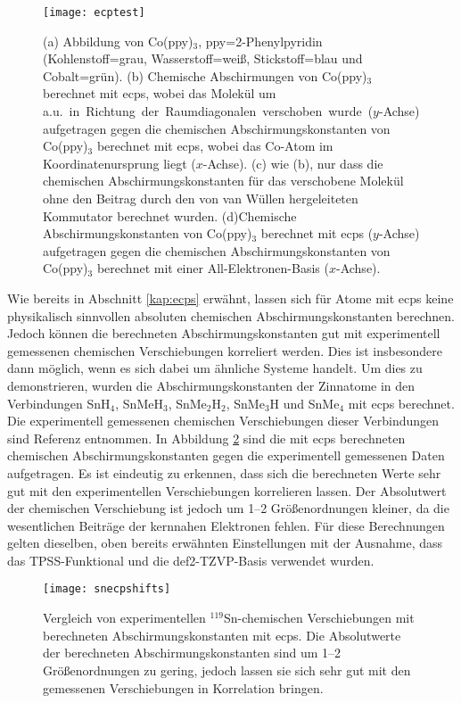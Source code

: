 \vfill
\newpage
\begin{figure}[ht!]
	\centering
	\texttt{[image: ecptest]}
	\captionsetup{figurewithin = chapter}
	\captionsetup{font=small, labelfont=bf}\caption[ECP-Testrechnungen an Co(ppy)$_3$]{\textsf{(a)} Abbildung von Co(ppy)$_3$, ppy=2-Phenylpyridin (Kohlenstoff=grau, Wasserstoff=weiß, Stickstoff=blau und Cobalt=grün). \textsf{(b)} Chemische Abschirmungen von Co(ppy)$_3$  berechnet mit \acp{ecp}, wobei das Molekül um \unit[10]{a.u.} in Richtung der Raumdiagonalen verschoben wurde ($y$-Achse) aufgetragen gegen die chemischen Abschirmungskonstanten von Co(ppy)$_3$ berechnet mit \acp{ecp}, wobei das Co-Atom im Koordinatenursprung liegt ($x$-Achse). \textsf{(c)} wie \textsf{(b)}, nur dass die chemischen Abschirmungskonstanten für das verschobene Molekül ohne den Beitrag durch den von van Wüllen hergeleiteten Kommutator berechnet wurden. \textsf{(d)}Chemische Abschirmungskonstanten von Co(ppy)$_3$ berechnet mit \acp{ecp} ($y$-Achse) aufgetragen gegen die chemischen Abschirmungskonstanten von Co(ppy)$_3$ berechnet mit einer All-Elektronen-Basis ($x$-Achse).}
\label{abb:coppy3test}
\end{figure}
\vfill
\newpage

Wie bereits in Abschnitt \ref{kap:ecps} erwähnt, lassen sich für Atome mit \acp{ecp} keine physikalisch sinnvollen absoluten chemischen Abschirmungskonstanten berechnen. Jedoch können die berechneten Abschirmungskonstanten gut mit experimentell gemessenen chemischen Verschiebungen korreliert werden. Dies ist insbesondere dann möglich, wenn es sich dabei um ähnliche Systeme handelt. Um dies zu demonstrieren, wurden die Abschirmungskonstanten der Zinnatome in den Verbindungen SnH$_4$, SnMeH$_3$, SnMe$_2$H$_2$, SnMe$_3$H und SnMe$_4$ mit \acp{ecp} berechnet. Die experimentell gemessenen chemischen Verschiebungen dieser Verbindungen sind Referenz \cite{vivas2002dft} entnommen. In Abbildung \ref{abb:snecpshifts} sind die mit \acp{ecp} berechneten chemischen Abschirmungskonstanten gegen die experimentell gemessenen Daten aufgetragen. Es ist eindeutig zu erkennen, dass sich die berechneten Werte sehr gut mit den experimentellen Verschiebungen korrelieren lassen. Der Absolutwert der chemischen Verschiebung ist jedoch um 1--2 Größenordnungen kleiner, da die wesentlichen Beiträge der kernnahen Elektronen fehlen. Für diese Berechnungen gelten dieselben, oben bereits erwähnten Einstellungen mit der Ausnahme, dass das TPSS-Funktional\supercite{tao2003climbing} und die def2-TZVP-Basis\supercite{weigend2005balanced} verwendet wurden.
\begin{figure}[ht!]
	\centering
	\texttt{[image: snecpshifts]}
	\captionsetup{figurewithin = chapter}
	\captionsetup{font=small, labelfont=bf}\caption[Vergleich von experimentellen $^{119}$Sn-chemischen Verschiebungen mit berechneten Abschirmungskonstanten]{Vergleich von experimentellen $^{119}$Sn-chemischen Verschiebungen mit berechneten Abschirmungskonstanten mit \acp{ecp}. Die Absolutwerte der berechneten Abschirmungskonstanten sind um 1--2 Größenordnungen zu gering, jedoch lassen sie sich sehr gut mit den gemessenen Verschiebungen in Korrelation bringen.}
\label{abb:snecpshifts}
\end{figure}
	
